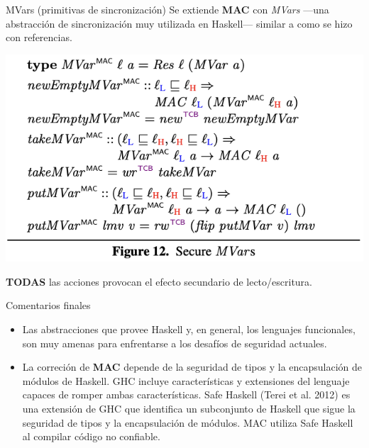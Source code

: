 \documentclass{beamer}
\begin{document}
\begin{frame}{MVars (primitivas de sincronización)}
    Se extiende \textbf{MAC} con \textit{MVars} ---una abstracción de sincronización muy utilizada en Haskell--- similar a como se hizo con referencias.
    
    \begin{center}
        \includegraphics[scale=0.7]{figure12.png}
    \end{center}

    \textbf{TODAS} las acciones provocan el efecto secundario de lecto/escritura.
\end{frame}

\begin{frame}{Comentarios finales}
    \begin{itemize}
        \item<1-> Las abstracciones que provee Haskell y, en general, los lenguajes funcionales, son muy amenas para enfrentarse a los desafíos de seguridad actuales.

        \item<2-> La correción de \textbf{MAC} depende de la seguridad de tipos y la encapsulación de módulos de Haskell. GHC incluye características y extensiones del lenguaje capaces de romper ambas características. Safe Haskell (Terei et al. 2012) es una extensión de GHC que identifica un subconjunto de Haskell que sigue la seguridad de tipos y la encapsulación de módulos. MAC utiliza Safe Haskell al compilar código no confiable.
    \end{itemize}
\end{frame}
\end{document}
